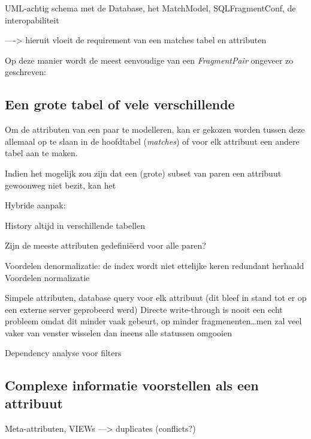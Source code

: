 UML-achtig schema met de Database, het MatchModel, SQLFragmentConf, de interopabiliteit

----> hieruit vloeit de requirement van een matches tabel en attributen

Op deze manier wordt de meest eenvoudige van een \emph{FragmentPair} ongeveer zo geschreven:



\subsection{Een grote tabel of vele verschillende}

Om de attributen van een paar te modelleren, kan er gekozen worden tussen deze allemaal op te slaan in de hoofdtabel (\emph{matches}) of voor elk attribuut een andere tabel aan te maken.

Indien het mogelijk zou zijn dat een (grote) subset van paren een attribuut gewoonweg niet bezit, kan het 

Hybride aanpak:

History altijd in verschillende tabellen


Zijn de meeste attributen gedefini\"eerd voor alle paren?

Voordelen denormalizatie: de index wordt niet ettelijke keren redundant herhaald
Voordelen normalizatie

Simpele attributen, database query voor elk attribuut (dit bleef in stand tot er op een externe server geprobeerd werd)
Directe write-through is nooit een echt probleem omdat dit minder vaak gebeurt, op minder fragmenenten\ldots men zal veel vaker van venster wisselen dan ineens alle statussen omgooien

Dependency analyse voor filters

\subsection{Complexe informatie voorstellen als een attribuut}
Meta-attributen, VIEWs ---> duplicates (conflicts?)

